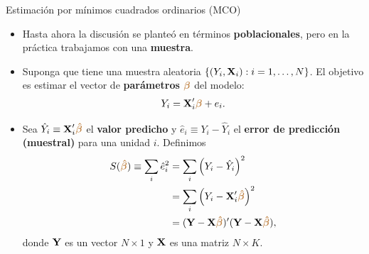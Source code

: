 \documentclass[9pt, xcolor=dvipsnames]{beamer}
\begin{document}
\begin{frame}{Estimación por mínimos cuadrados ordinarios (MCO)}

\begin{itemize}
    \item Hasta ahora la discusión se planteó en términos \textbf{poblacionales}, pero en la práctica trabajamos con una \textbf{muestra}. %
    \item Suponga que tiene una muestra aleatoria $\{(Y_i, \textbf{X}_i): i=1, \ldots,N\}$. El objetivo es estimar el vector de \textbf{parámetros} $\textcolor{brown}{\boldsymbol{\beta}}$ del modelo:
    \begin{align*}
    \begin{split}
        Y_i = \textbf{X}'_i \textcolor{brown}{\boldsymbol{\beta}} + e_i.
    \end{split}
    \end{align*}
    \item Sea $\hat{Y}_i \equiv \textbf{X}'_{i} \textcolor{brown}{\boldsymbol{\hat{\beta}}}$ el \textbf{valor predicho} y $\hat{e}_i \equiv Y_i - \hat{Y}_i$ el \textbf{error de predicción (muestral)} para una unidad $i$. Definimos 
    \begin{align*}
    \begin{split}
    S(\textcolor{brown}{\boldsymbol{\hat{\beta}}}) \equiv \sum_{i} \hat{e}^2_i &= \sum_{i} \left(Y_i - \hat{Y}_i\right)^2 \\ &=  \sum_{i} \left(Y_i - \textbf{X}'_{i} \textcolor{brown}{\boldsymbol{\hat{\beta}}}\right)^2 \\ &= (\textbf{Y} - \textbf{X} \textcolor{brown}{\boldsymbol{\hat{\beta}}})'(\textbf{Y} - \textbf{X} \textcolor{brown}{\boldsymbol{\hat{\beta}}}),
    \end{split}
    \end{align*} 
    donde \(\textbf{Y}\) es un vector \(N \times 1\) y \(\textbf{X}\) es una matriz \(N \times K\).
\end{itemize}
\end{frame}
\end{document}
